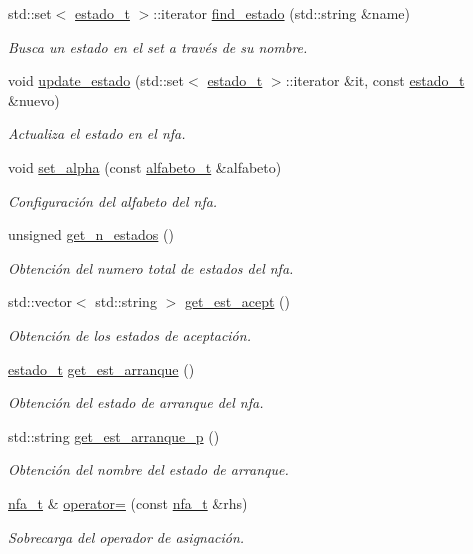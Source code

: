 \begin{DoxyCompactItemize}
std\+::set$<$ \hyperlink{classestado__t}{estado\+\_\+t} $>$\+::iterator \hyperlink{classnfa__t_a3aec6eceda15056b3099396e9807a515}{find\+\_\+estado} (std\+::string \&name)
\begin{DoxyCompactList}\small\item\em Busca un estado en el set a través de su nombre. \end{DoxyCompactList}\item 
void \hyperlink{classnfa__t_acc1c6598fd71f807abeaddcfbe2cd06b}{update\+\_\+estado} (std\+::set$<$ \hyperlink{classestado__t}{estado\+\_\+t} $>$\+::iterator \&it, const \hyperlink{classestado__t}{estado\+\_\+t} \&nuevo)
\begin{DoxyCompactList}\small\item\em Actualiza el estado en el nfa. \end{DoxyCompactList}\item 
void \hyperlink{classnfa__t_aaaab7f2809d9630a00059b36f7e505cc}{set\+\_\+alpha} (const \hyperlink{classalfabeto__t}{alfabeto\+\_\+t} \&alfabeto)
\begin{DoxyCompactList}\small\item\em Configuración del alfabeto del nfa. \end{DoxyCompactList}\item 
unsigned \hyperlink{classnfa__t_a625c266cc754a846089b604a611ed31e}{get\+\_\+n\+\_\+estados} ()
\begin{DoxyCompactList}\small\item\em Obtención del numero total de estados del nfa. \end{DoxyCompactList}\item 
std\+::vector$<$ std\+::string $>$ \hyperlink{classnfa__t_af79e10ba315f1a07af4193e242d3eac1}{get\+\_\+est\+\_\+acept} ()
\begin{DoxyCompactList}\small\item\em Obtención de los estados de aceptación. \end{DoxyCompactList}\item 
\hyperlink{classestado__t}{estado\+\_\+t} \hyperlink{classnfa__t_a37c1254862fdce74c2a1ff879f9d78a6}{get\+\_\+est\+\_\+arranque} ()
\begin{DoxyCompactList}\small\item\em Obtención del estado de arranque del nfa. \end{DoxyCompactList}\item 
std\+::string \hyperlink{classnfa__t_a2a51944fd1b071bc432753d1cbc68fad}{get\+\_\+est\+\_\+arranque\+\_\+p} ()
\begin{DoxyCompactList}\small\item\em Obtención del nombre del estado de arranque. \end{DoxyCompactList}\item 
\hyperlink{classnfa__t}{nfa\+\_\+t} \& \hyperlink{classnfa__t_af599a01efe013fcfd1dea6af1c6f974a}{operator=} (const \hyperlink{classnfa__t}{nfa\+\_\+t} \&rhs)
\begin{DoxyCompactList}\small\item\em Sobrecarga del operador de asignación. \end{DoxyCompactList}\end{DoxyCompactItemize}


